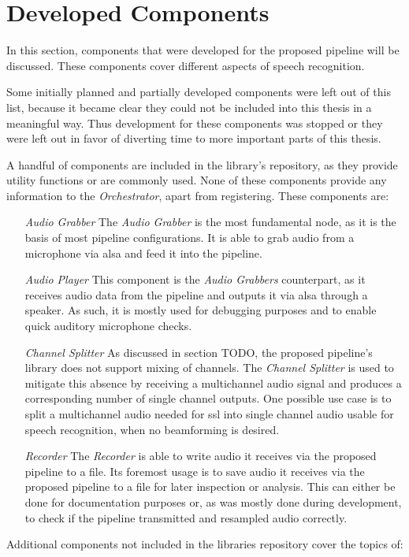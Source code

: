 
\section{Developed Components}
\label{main:components:start}
In this section, components that were developed for the proposed pipeline will be discussed.
These components cover different aspects of speech recognition.

Some initially planned and partially developed components were left out of this list, because it became clear they could not be included into this thesis in a meaningful way.
Thus development for these components was stopped or they were left out in favor of diverting time to more important parts of this thesis.


A handful of components are included in the library's repository, as they provide utility functions or are commonly used.
None of these components provide any information to the \textit{Orchestrator}, apart from registering.
These components are:
\begin{itemize}[leftmargin=1in]
	\item[\textit{Audio Grabber}] The \textit{Audio Grabber} is the most fundamental node, as it is the basis of most pipeline configurations.
	It is able to grab audio from a microphone via \gls{alsa} and feed it into the pipeline.

	\item[\textit{Audio Player}] This component is the \textit{Audio Grabbers} counterpart, as it receives audio data from the pipeline and outputs it via \gls{alsa} through a speaker.
	As such, it is mostly used for debugging purposes and to enable quick auditory microphone checks.

	\item[\textit{Channel Splitter}] As discussed in section TODO, the proposed pipeline's library does not support mixing of channels.
	The \textit{Channel Splitter} is used to mitigate this absence by receiving a multichannel audio signal and produces a corresponding number of single channel outputs.
	One possible use case is to split a multichannel audio needed for \gls{ssl} into single channel audio usable for speech recognition, when no beamforming is desired.

	\item[\textit{Recorder}] The \textit{Recorder} is able to write audio it receives via the proposed pipeline to a file.
	Its foremost usage is to save audio it receives via the proposed pipeline to a file for later inspection or analysis.
	This can either be done for documentation purposes or, as was mostly done during development, to check if the pipeline transmitted and resampled audio correctly.
\end{itemize}
Additional components not included in the libraries repository cover the topics of:

